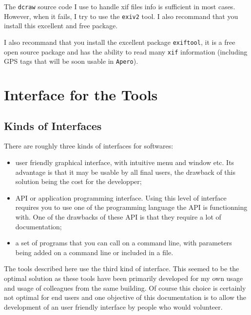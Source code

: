 The {\tt dcraw} source code I use to handle xif files info is sufficient in most cases.
However, when it fails, I try to use the {\tt exiv2} tool. I also recommand that 
you install this excellent and free package.

I also recommand that you install the excellent package {\tt exiftool}, it is a free
open source package and has the ability to read many {\tt xif} information (including
GPS tags that will be soon usable in {\tt Apero}).




\section{Interface for the Tools}

\subsection{Kinds of Interfaces}
There are roughly three kinds of interfaces for softwares:

\begin{itemize}
   \item user friendly graphical interface, with intuitive menu and window etc.
         Its advantage is that it may be usable by all final users, 
         the drawback of this solution being the cost for the developper;

   \item API or application programming interface. Using this level of interface requires you
         to use one of the programming language the API is functionning with. One of
         the drawbacks of these API is that they require a lot of documentation;

   \item a set of programs that you can call on a command line, with parameters being
         added on a command line or included in a file.
         
\end{itemize}

The tools described here use the third kind of interface. This seemed to be the
optimal solution as these tools have been primarily developed for my own usage and
usage of colleagues from the same building.  Of course this choice is certainly
not optimal for end users and one objective of this documentation is to  allow
the development of an user friendly interface by people who would volunteer.

